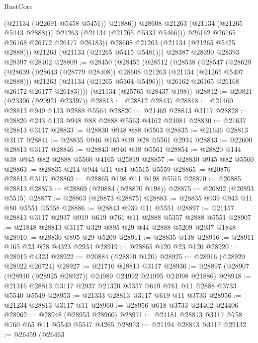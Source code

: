 \begin{lexlean}{RustCore}
\begin{coremodule}
                    (@21134 (@22691 @5458 @5451))
                    @21886))
                @28608
                @21263
                (@21134 (@21265 @5443 @2888)))
              @21263
              (@21134 (@21265 @5433 @5466)))
            @26162
            @26165
            @26168
            @26172
            @26177
            @26183))
        @28608
        @21263
        (@21134 (@21265 @5425 @2888)))
      @21263
      (@21134 (@21265 @5415 @5481)))
    @28387
    @28390
    @28393
    @28397
    @28402
@28809 := @28450
    (@28455
      (@28512
        (@28538
          (@28547
            (@28629
              (@28639 (@28643 (@28779 @28408)) @28608 @21263 (@21134 (@21265 @5407 @2888)))
              @21263
              (@21134 (@21265 @5364 @5496)))
            @26162
            @26165
            @26168
            @26172
            @26177
            @26183))))
    (@21134 (@25765 @28437 @198))
@28812 := @20821 (@23396 (@20921 @23397))
@28813 := @28812 @28437
@28818 := @21460 @28813 @949 @133 @2888 @5564
@28820 := @21469 @28813 @3117
@28828 := @28820 @243 @133 @948 @88 @2888 @5563 @4162 @24081
@28830 := @21637 @28813 @3117
@28833 := @28830 @948 @88 @5563
@28835 := @21646 @28813 @3117
@28841 := @28835 @946 @165 @38 @28 @5561 @2934
@28843 := @22600 @28813 @3117
@28846 := @28843 @946 @38 @5561
@28854 := @28820 @144 @38 @945 @82 @2888 @5560 @4165 @25819
@28857 := @28830 @945 @82 @5560
@28863 := @28835 @214 @944 @11 @81 @5515 @5559
@28865 := @20876 @28813 @3117
@28869 := @28865 @198 @11 @198 @5515
@28870 := @20885 @28813
@28873 := @28869 (@20884 (@28870 @198))
@28875 := @20892 (@20893 @5515)
@28877 := @28863 (@28873 @28875)
@28883 := @28835 @939 @943 @11 @80 @5551 @5558
@28886 := @28843 @939 @11 @5551
@28897 := @21157 @28813 @3117 @2937 @919 @619 @761 @11 @2888 @5357 @2888 @5551
@28907 := @21848 @28813 @3117 @329 @895 @29 @44 @2888 @5209 @2937 @1848
@28910 := @28830 @895 @29 @5209
@28911 := @28835 @138
@28916 := @28911 @165 @23 @28 @4323 @2934
@28919 := @28865 @120 @23 @120
@28920 := @28919 @4323
@28922 := @20884 (@28870 @120)
@28925 := @28916 (@28920 @28922 @26724)
@28927 := @21710 @28813 @3117
@28936 := @28897 (@28907 (@28910 (@28925 @28927)) @24989 @24992 @24995 @24998 @21886)
@28948 := @21316 @28813 @3117 @2937 @21320 @5357 @619 @761 @11 @2888 @3733 @5540 @5549
@28953 := @21333 @28813 @3117 @619 @11 @3733
@28956 := @21234 @28813 @3117 @11
@28960 := @28956 @618 @3733 @24402 @24406
@28962 := @28948 (@28953 @28960)
@28971 := @21181 @28813 @3117 @758 @760 @65 @11 @5540 @5547 @4265
@28973 := @21194 @28813 @3117
@29132 := @26459
    (@26463

\end{coremodule}
\end{lexlean}
